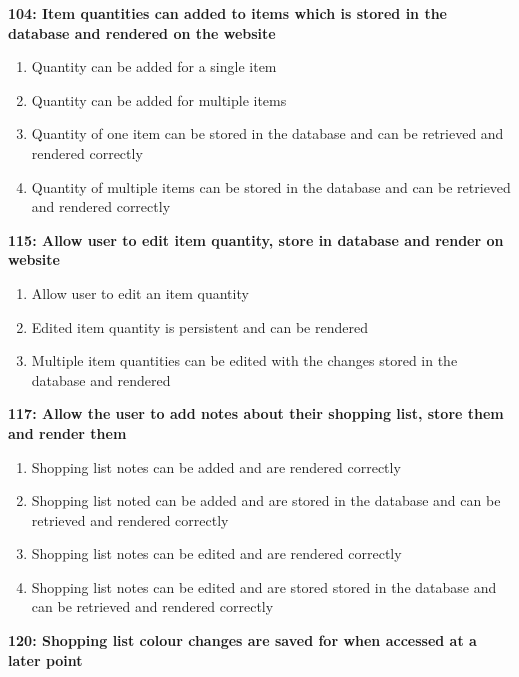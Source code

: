 \documentclass[10pt,onecolumn]{witseiepaper}
\begin{document}
\textbf{104: Item quantities can added to items which is stored in the database and rendered on the website}

\begin{enumerate}
	\item Quantity can be added for a single item
	\item Quantity can be added for multiple items
	\item Quantity of one item can be stored in the database and can be retrieved and rendered correctly
	\item Quantity of multiple items can be stored in the database and can be retrieved and rendered correctly
\end{enumerate}

\textbf{115: Allow user to edit item quantity, store in database and render on website}

\begin{enumerate}
	\item Allow user to edit an item quantity
	\item Edited item quantity is persistent and can be rendered
	\item Multiple item quantities can be edited with the changes stored in the database and rendered
\end{enumerate}

%

\textbf{117: Allow the user to add notes about their shopping list, store them and render them}

\begin{enumerate}
	\item Shopping list notes can be added and are rendered correctly
	\item Shopping list noted can be added and are stored in the database and can be retrieved and rendered correctly
	\item Shopping list notes can be edited and are rendered correctly
	\item Shopping list notes can be edited and are stored stored in the database and can be retrieved and rendered correctly
\end{enumerate}

\textbf{120: Shopping list colour changes are saved for when accessed at a later point}
\end{document}
